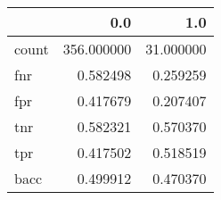 \begin{tabular}{lrr}
\toprule
{} &         0.0 &        1.0 \\
\midrule
count &  356.000000 &  31.000000 \\
fnr   &    0.582498 &   0.259259 \\
fpr   &    0.417679 &   0.207407 \\
tnr   &    0.582321 &   0.570370 \\
tpr   &    0.417502 &   0.518519 \\
bacc  &    0.499912 &   0.470370 \\
\bottomrule
\end{tabular}
